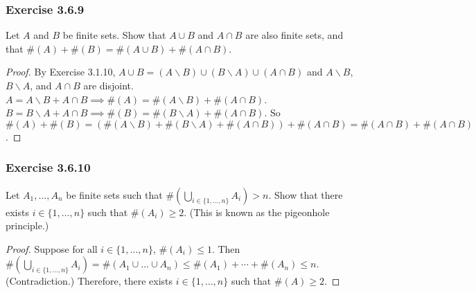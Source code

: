 \documentclass[12pt, letter]{article}
\begin{document}
\subsubsection*{Exercise 3.6.9}
Let $A$ and $B$ be finite sets. Show that $A\cup B$ and $A\cap B$ are also finite sets, and that $\#(A)+\#(B)=\#(A\cup B)+\#(A\cap B)$.
\begin{proof}
    By Exercise 3.1.10, $A\cup B=(A\backslash B)\cup (B\backslash A)\cup (A\cap B)$ and $A\backslash B$, $B\backslash A$, and $A\cap B$ are disjoint. 
    $A=A\backslash B+A\cap B \implies \#(A)=\#(A\backslash B)+\#(A\cap B)$. $B=B\backslash A+A\cap B \implies \#(B)=\#(B\backslash A)+\#(A\cap B)$.
    So $\#(A)+\#(B)=(\#(A\backslash B)+\#(B\backslash A)+\#(A\cap B))+\#(A\cap B)=\#(A\cap B)+\#(A\cap B)$.
\end{proof}
\subsubsection*{Exercise 3.6.10}
Let $A_1, \dotsc, A_n$ be finite sets such that $\#(\bigcup_{i\in\{1,\dotsc,n\}}A_i)>n$. Show that there exists
$i\in\{1,\dotsc,n\}$ such that $\#(A_i)\geq 2$. (This is known as the pigeonhole principle.)
\begin{proof}
    Suppose for all $i\in\{1,\dotsc,n\}$, $\#(A_i)\leq 1$. Then $\#(\bigcup_{i\in\{1,\dotsc,n\}}A_i)=\#(A_1\cup\dotsc\cup A_n)\leq 
    \#(A_1)+\cdots+\#(A_n)\leq n$. (Contradiction.) Therefore, there exists $i\in\{1,\dotsc,n\}$ such that $\#(A)\geq 2$.
\end{proof}
\end{document}
